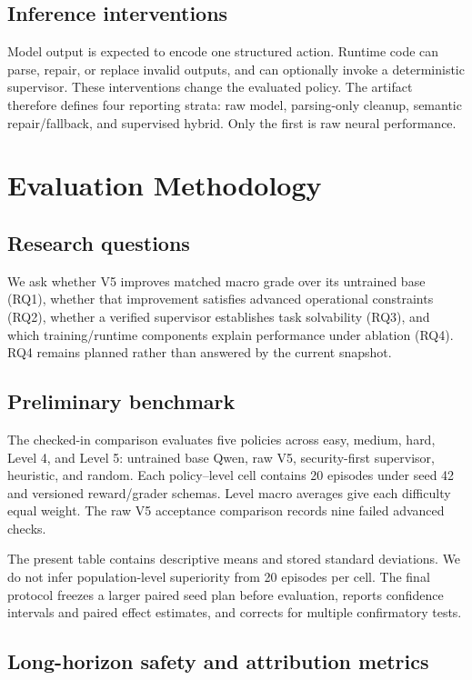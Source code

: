 \documentclass[11pt]{article}
\begin{document}
\subsection{Inference interventions}

Model output is expected to encode one structured action. Runtime code can parse, repair, or replace invalid outputs, and can optionally invoke a deterministic supervisor. These interventions change the evaluated policy. The artifact therefore defines four reporting strata: raw model, parsing-only cleanup, semantic repair/fallback, and supervised hybrid. Only the first is raw neural performance.

\section{Evaluation Methodology}

\subsection{Research questions}

We ask whether V5 improves matched macro grade over its untrained base (RQ1), whether that improvement satisfies advanced operational constraints (RQ2), whether a verified supervisor establishes task solvability (RQ3), and which training/runtime components explain performance under ablation (RQ4). RQ4 remains planned rather than answered by the current snapshot.

\subsection{Preliminary benchmark}

The checked-in comparison evaluates five policies across easy, medium, hard, Level 4, and Level 5: untrained base Qwen, raw V5, security-first supervisor, heuristic, and random. Each policy--level cell contains 20 episodes under seed 42 and versioned reward/grader schemas. Level macro averages give each difficulty equal weight. The raw V5 acceptance comparison records nine failed advanced checks.

The present table contains descriptive means and stored standard deviations. We do not infer population-level superiority from 20 episodes per cell. The final protocol freezes a larger paired seed plan before evaluation, reports confidence intervals and paired effect estimates, and corrects for multiple confirmatory tests.

\subsection{Long-horizon safety and attribution metrics}
\end{document}
